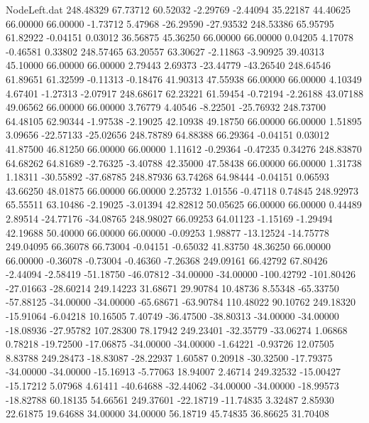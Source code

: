 \begin{filecontents}{NodeLeft.dat}
 248.48329   67.73712   60.52032    -2.29769   -2.44094   35.22187   44.40625   66.00000   66.00000   -1.73712    5.47968  -26.29590  -27.93532
 248.53386   65.95795   61.82922    -0.04151    0.03012   36.56875   45.36250   66.00000   66.00000    0.04205    4.17078   -0.46581    0.33802
 248.57465   63.20557   63.30627    -2.11863   -3.90925   39.40313   45.10000   66.00000   66.00000    2.79443    2.69373  -23.44779  -43.26540
 248.64546   61.89651   61.32599    -0.11313   -0.18476   41.90313   47.55938   66.00000   66.00000    4.10349    4.67401   -1.27313   -2.07917
 248.68617   62.23221   61.59454    -0.72194   -2.26188   43.07188   49.06562   66.00000   66.00000    3.76779    4.40546   -8.22501  -25.76932
 248.73700   64.48105   62.90344    -1.97538   -2.19025   42.10938   49.18750   66.00000   66.00000    1.51895    3.09656  -22.57133  -25.02656
 248.78789   64.88388   66.29364    -0.04151    0.03012   41.87500   46.81250   66.00000   66.00000    1.11612   -0.29364   -0.47235    0.34276
 248.83870   64.68262   64.81689    -2.76325   -3.40788   42.35000   47.58438   66.00000   66.00000    1.31738    1.18311  -30.55892  -37.68785
 248.87936   63.74268   64.98444    -0.04151    0.06593   43.66250   48.01875   66.00000   66.00000    2.25732    1.01556   -0.47118    0.74845
 248.92973   65.55511   63.10486    -2.19025   -3.01394   42.82812   50.05625   66.00000   66.00000    0.44489    2.89514  -24.77176  -34.08765
 248.98027   66.09253   64.01123    -1.15169   -1.29494   42.19688   50.40000   66.00000   66.00000   -0.09253    1.98877  -13.12524  -14.75778
 249.04095   66.36078   66.73004    -0.04151   -0.65032   41.83750   48.36250   66.00000   66.00000   -0.36078   -0.73004   -0.46360   -7.26368
 249.09161   66.42792   67.80426    -2.44094   -2.58419  -51.18750  -46.07812  -34.00000  -34.00000 -100.42792 -101.80426  -27.01663  -28.60214
 249.14223   31.68671   29.90784    10.48736    8.55348  -65.33750  -57.88125  -34.00000  -34.00000  -65.68671  -63.90784  110.48022   90.10762
 249.18320  -15.91064   -6.04218    10.16505    7.40749  -36.47500  -38.80313  -34.00000  -34.00000  -18.08936  -27.95782  107.28300   78.17942
 249.23401  -32.35779  -33.06274     1.06868    0.78218  -19.72500  -17.06875  -34.00000  -34.00000   -1.64221   -0.93726   12.07505    8.83788
 249.28473  -18.83087  -28.22937     1.60587    0.20918  -30.32500  -17.79375  -34.00000  -34.00000  -15.16913   -5.77063   18.94007    2.46714
 249.32532  -15.00427  -15.17212     5.07968    4.61411  -40.64688  -32.44062  -34.00000  -34.00000  -18.99573  -18.82788   60.18135   54.66561
 249.37601  -22.18719  -11.74835     3.32487    2.85930   22.61875   19.64688   34.00000   34.00000   56.18719   45.74835   36.86625   31.70408

\end{filecontents}
